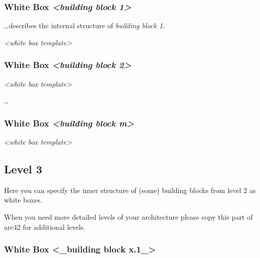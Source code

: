 \hypertarget{_white_box_emphasis_building_block_1_emphasis}{%
\subsubsection{\texorpdfstring{White Box \emph{\textless building block
1\textgreater{}}}{White Box \textless building block 1\textgreater{}}}\label{_white_box_emphasis_building_block_1_emphasis}}

\ldots describes the internal structure of \emph{building block 1}.

\emph{\textless white box template\textgreater{}}

\hypertarget{_white_box_emphasis_building_block_2_emphasis}{%
\subsubsection{\texorpdfstring{White Box \emph{\textless building block
2\textgreater{}}}{White Box \textless building block 2\textgreater{}}}\label{_white_box_emphasis_building_block_2_emphasis}}

\emph{\textless white box template\textgreater{}}

\ldots{}

\hypertarget{_white_box_emphasis_building_block_m_emphasis}{%
\subsubsection{\texorpdfstring{White Box \emph{\textless building block
m\textgreater{}}}{White Box \textless building block m\textgreater{}}}\label{_white_box_emphasis_building_block_m_emphasis}}

\emph{\textless white box template\textgreater{}}

\hypertarget{_level_3}{%
\subsection{Level 3}\label{_level_3}}

Here you can specify the inner structure of (some) building blocks from
level 2 as white boxes.

When you need more detailed levels of your architecture please copy this
part of arc42 for additional levels.

\hypertarget{_white_box_building_block_x_1}{%
\subsubsection{White Box \textless\_building block
x.1\_\textgreater{}}\label{_white_box_building_block_x_1}}

